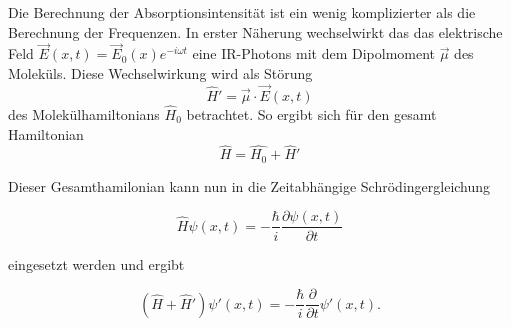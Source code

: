 \documentclass[a4paper,12pt]{article}
\begin{document}
Die Berechnung der Absorptionsintensität ist ein wenig komplizierter als die Berechnung der Frequenzen. In erster Näherung wechselwirkt das
das elektrische Feld $\vec{E}(x,t)=\vec{E}_0(x)e^{-i\omega t}$ eine IR-Photons mit dem Dipolmoment $\vec{\mu}$ des Moleküls. Diese Wechselwirkung
wird als Störung 
\begin{equation}
\hat{H}'= \vec{\mu}\cdot \vec{E}(x,t)
\end{equation}
 des Molekülhamiltonians $\hat{H}_0$ betrachtet. So ergibt sich für den gesamt Hamiltonian 
\begin{equation}
 \hat{H}=\hat{H_0}+\hat{H}'
\end{equation}

Dieser Gesamthamilonian kann nun in die Zeitabhängige Schrödingergleichung 

\begin{equation}\label{schroedinger}
 \hat{H}\psi(x,t)=-\frac{\hbar}{i} \frac{\partial \psi(x,t)}{\partial t}
\end{equation}

eingesetzt werden und ergibt

\begin{equation}\label{schroedingerpert}
 (\hat{H}+\hat{H}')\psi'(x,t)=-\frac{\hbar}{i}\frac{\partial}{\partial t}\psi'(x,t).
\end{equation}
\end{document}
